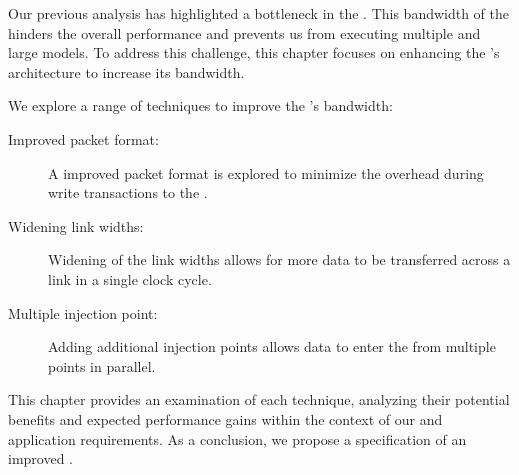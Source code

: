 

Our previous analysis has highlighted a bottleneck in the \confignoc{}.
This bandwidth of the \confignoc{} hinders the overall performance and prevents us from executing multiple and large models.
To address this challenge, this chapter focuses on enhancing the \confignoc{}'s architecture to increase its bandwidth.

We explore a range of techniques to improve the \confignoc{}'s bandwidth:
\begin{description}
    \item[Improved packet format:]
    A improved packet format is explored to minimize the overhead during write transactions to the \graicore{}.
    \item[Widening link widths:]
    Widening of the link widths allows for more data to be transferred across a link in a single clock cycle.
    \item[Multiple injection point:]
    Adding additional injection points allows data to enter the \confignoc{} from multiple points in parallel.
\end{description}

This chapter provides an examination of each technique, analyzing their potential benefits and expected performance gains within the context of our \confignoc{} and application requirements.
As a conclusion, we propose a specification of an improved \confignoc{}.
